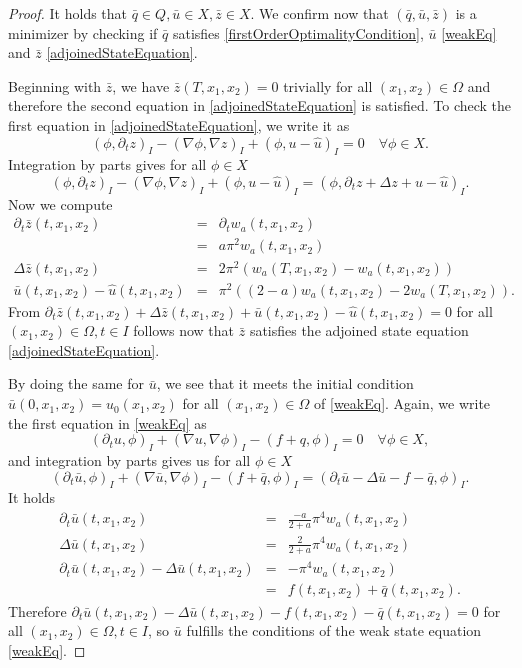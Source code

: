 \begin{proof}
It holds that $\bar{q}\in Q, \bar{u}\in X, \bar{z}\in X$. We confirm now that $(\bar{q}, \bar{u}, \bar{z})$ is a minimizer by checking if $\bar{q}$ satisfies \eqref{firstOrderOptimalityCondition}, $\bar{u}$ \eqref{weakEq} and $\bar{z}$ \eqref{adjoinedStateEquation}.

Beginning with $\bar{z}$, we have $\bar{z}(T, x_1, x_2)=0$ trivially for all $(x_1,x_2)\in\Omega$ and therefore the second equation in \eqref{adjoinedStateEquation} is satisfied. To check the first equation in \eqref{adjoinedStateEquation}, we write it as
\begin{displaymath}
(\phi,\partial_tz)_I-(\nabla \phi,\nabla z)_I+(\phi, u-\hat{u})_I=0\quad\forall\phi\in X.
\end{displaymath}
Integration by parts gives for all $\phi\in X$
\begin{displaymath}
(\phi,\partial_tz)_I-(\nabla \phi,\nabla z)_I+(\phi, u-\hat{u})_I=(\phi,\partial_tz+\Delta z+u-\hat{u})_I.
\end{displaymath}
Now we compute
\begin{eqnarray*}
\partial_t\bar{z}(t,x_1,x_2)&=&\partial_tw_a(t,x_1,x_2)\\
&=&a\pi^2w_a(t,x_1,x_2)\\
\Delta \bar{z}(t,x_1,x_2)&=&2\pi^2(w_a(T,x_1,x_2)-w_a(t,x_1,x_2))\\
\bar{u}(t,x_1,x_2)-\hat{u}(t,x_1,x_2)&=&\pi^2((2-a)w_a(t,x_1,x_2)-2w_a(T,x_1,x_2)).
\end{eqnarray*}
From $\partial_t\bar{z}(t,x_1,x_2)+\Delta \bar{z}(t,x_1,x_2)+\bar{u}(t,x_1,x_2)-\hat{u}(t,x_1,x_2)=0$ for all $(x_1,x_2)\in\Omega, t\in I$ follows now that $\bar{z}$ satisfies the adjoined state equation \eqref{adjoinedStateEquation}.

By doing the same for $\bar{u}$, we see that it meets the initial condition $\bar{u}(0,x_1,x_2)=u_0(x_1,x_2)$ for all $(x_1,x_2)\in\Omega$ of \eqref{weakEq}. Again, we write the first equation in \eqref{weakEq} as
\begin{displaymath}
(\partial_tu,\phi)_I+(\nabla u,\nabla\phi)_I-(f+q,\phi)_I=0\quad\forall\phi\in X,
\end{displaymath}
and integration by parts gives us for all $\phi\in X$
\begin{displaymath}
(\partial_t\bar{u},\phi)_I+(\nabla \bar{u},\nabla\phi)_I-(f+\bar{q},\phi)_I=(\partial_t\bar{u}-\Delta\bar{u}-f-\bar{q},\phi)_I.
\end{displaymath}
It holds
\begin{eqnarray*}
\partial_t\bar{u}(t,x_1,x_2)&=&\frac{-a}{2+a}\pi^4w_a(t,x_1,x_2)\\
\Delta \bar{u}(t,x_1,x_2)&=&\frac{2}{2+a}\pi^4w_a(t,x_1,x_2)\\
\partial_t\bar{u}(t,x_1,x_2)-\Delta \bar{u}(t,x_1,x_2)&=&-\pi^4w_a(t,x_1,x_2)\\
&=&f(t,x_1,x_2)+\bar{q}(t,x_1,x_2).
\end{eqnarray*}
Therefore $\partial_t\bar{u}(t,x_1,x_2)-\Delta\bar{u}(t,x_1,x_2)-f(t,x_1,x_2)-\bar{q}(t,x_1,x_2)=0$ for all $(x_1,x_2)\in\Omega, t\in I$, so $\bar{u}$ fulfills the conditions of the weak state equation \eqref{weakEq}.


\end{proof}
